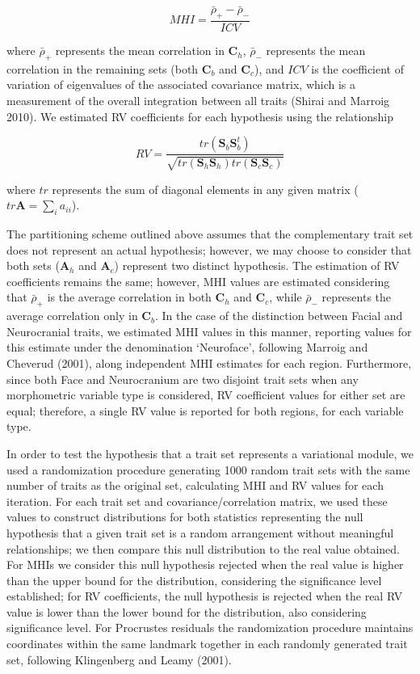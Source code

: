 \documentclass[12pt,]{article}
\begin{document}
\begin{equation}
MHI = \frac {\bar{\rho}_{+} - \bar{\rho}_{-}} {ICV}
\label{eq:mi}
\end{equation}

where $\bar{\rho}_{+}$ represents the mean correlation in
$\mathbf{C}_h$, $\bar{\rho}_{-}$ represents the mean correlation in the
remaining sets (both $\mathbf{C}_b$ and $\mathbf{C}_c$), and $ICV$ is
the coefficient of variation of eigenvalues of the associated covariance
matrix, which is a measurement of the overall integration between all
traits (Shirai and Marroig 2010). We estimated RV coefficients for each
hypothesis using the relationship

\begin{equation}
RV = \frac{tr(\mathbf{S}_{b}\mathbf{S}^t_{b})}{\sqrt{tr(\mathbf{S}_h \mathbf{S}_h)tr(\mathbf{S}_c \mathbf{S}_c)}}
\label{eq:rv}
\end{equation}

where $tr$ represents the sum of diagonal elements in any given matrix
($tr \mathbf{A} = \sum_i a_{ii}$).

The partitioning scheme outlined above assumes that the complementary
trait set does not represent an actual hypothesis; however, we may
choose to consider that both sets ($\mathbf{A}_h$ and $\mathbf{A}_c$)
represent two distinct hypothesis. The estimation of RV coefficients
remains the same; however, MHI values are estimated considering that
$\bar{\rho}_{+}$ is the average correlation in both $\mathbf{C}_h$ and
$\mathbf{C}_c$, while $\bar{\rho}_{-}$ represents the average
correlation only in $\mathbf{C}_b$. In the case of the distinction
between Facial and Neurocranial traits, we estimated MHI values in this
manner, reporting values for this estimate under the denomination
`Neuroface', following Marroig and Cheverud (2001), along independent
MHI estimates for each region. Furthermore, since both Face and
Neurocranium are two disjoint trait sets when any morphometric variable
type is considered, RV coefficient values for either set are equal;
therefore, a single RV value is reported for both regions, for each
variable type.

In order to test the hypothesis that a trait set represents a
variational module, we used a randomization procedure generating 1000
random trait sets with the same number of traits as the original set,
calculating MHI and RV values for each iteration. For each trait set and
covariance/correlation matrix, we used these values to construct
distributions for both statistics representing the null hypothesis that
a given trait set is a random arrangement without meaningful
relationships; we then compare this null distribution to the real value
obtained. For MHIs we consider this null hypothesis rejected when the
real value is higher than the upper bound for the distribution,
considering the significance level established; for RV coefficients, the
null hypothesis is rejected when the real RV value is lower than the
lower bound for the distribution, also considering significance level.
For Procrustes residuals the randomization procedure maintains
coordinates within the same landmark together in each randomly generated
trait set, following Klingenberg and Leamy (2001).
\end{document}

